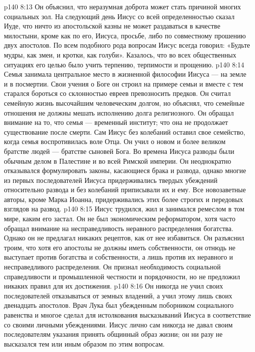 \vs p140 8:13 Он объяснил, что неразумная доброта может стать причиной многих социальных зол. На следующий день Иисус со всей определенностью сказал Иуде, что ничто из апостольской казны не может раздаваться в качестве милостыни, кроме как по его, Иисуса, просьбе, либо по совместному прошению двух апостолов. По всем подобного рода вопросам Иисус всегда говорил: «Будьте мудры, как змеи, и кротки, как голуби». Казалось, что во всех общественных ситуациях его целью было учить терпению, терпимости и прощению.
\vs p140 8:14 Семья занимала центральное место в жизненной философии Иисуса --- на земле и в посмертии. Свои учения о Боге он строил на примере семьи и вместе с тем старался бороться со склонностью евреев превозносить предков. Он считал семейную жизнь высочайшим человеческим долгом, но объяснял, что семейные отношения не должны мешать исполнению долга религиозного. Он обращал внимание на то, что семья --- временный институт; что она не продолжает существование после смерти. Сам Иисус без колебаний оставил свое семейство, когда семья воспротивилась воле Отца. Он учил о новом и более великом братстве людей --- братстве сыновей Бога. Во времена Иисуса разводы были обычным делом в Палестине и во всей Римской империи. Он неоднократно отказывался формулировать законы, касающиеся брака и развода, однако многие из первых последователей Иисуса придерживались твердых убеждений относительно развода и без колебаний приписывали их и ему. Все новозаветные авторы, кроме Марка Иоанна, придерживались этих более строгих и передовых взглядов на развод.
\vs p140 8:15 \pc {}\bibnobreakspace {} Иисус трудился, жил и занимался ремеслом в том мире, каким его застал. Он не был экономическим реформатором, хотя часто обращал внимание на несправедливость неравного распределения богатства. Однако он не предлагал никаких рецептов, как от нее избавиться. Он разъяснил троим, что хотя его апостолы не должны иметь собственности, он отнюдь не выступает против богатства и собственности, а лишь против их неравного и несправедливого распределения. Он признал необходимость социальной справедливости и промышленной честности и порядочности, но не предложил никаких правил для их достижения.
\vs p140 8:16 Он никогда не учил своих последователей отказываться от земных владений, а учил этому лишь своих двенадцать апостолов. Врач Лука был убежденным поборником социального равенства и многое сделал для истолкования высказываний Иисуса в соответствие со своими личными убеждениями. Иисус лично сам никогда не давал своим последователям указания принять общинный образ жизни; он ни разу не высказался тем или иным образом по этим вопросам.

